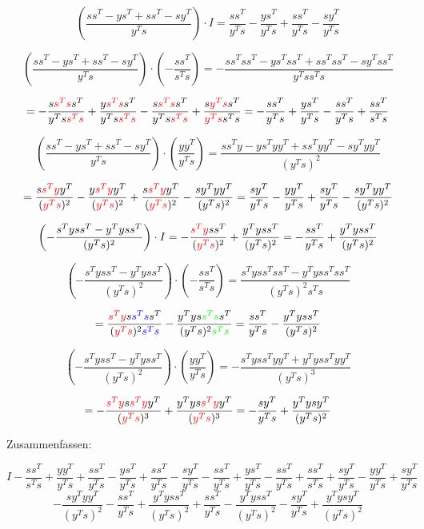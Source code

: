 \documentclass[a4paper, 12pt]{report}
\begin{document}
$$\left(\frac{ss^T - ys^T + ss^T - sy^T}{y^Ts}\right) \cdot I = \frac{ss^T}{y^Ts} - \frac{ys^T}{y^Ts} + \frac{ss^T}{y^Ts} - \frac{sy^T}{y^Ts}$$

$$\left(\frac{ss^T - ys^T + ss^T - sy^T}{y^Ts}\right)\cdot\left( - \frac{ss^T}{s^Ts} \right) = -\frac{ss^Tss^T - ys^Tss^T + ss^Tss^T - sy^Tss^T}{y^Tss^Ts}$$

$$= -\frac{s\textcolor{red}{s^Ts}s^T}{y^Ts\textcolor{red}{s^Ts}} + \frac{y\textcolor{red}{s^Ts}s^T}{y^Ts\textcolor{red}{s^Ts}} - \frac{s\textcolor{red}{s^Ts}s^T}{y^Ts\textcolor{red}{s^Ts}} + \frac{s\textcolor{red}{y^Ts}s^T}{\textcolor{red}{y^Ts}s^Ts} = -\frac{ss^T}{y^Ts} + \frac{ys^T}{y^Ts} - \frac{ss^T}{y^Ts} + \frac{ss^T}{s^Ts}$$

$$\left(\frac{ss^T - ys^T + ss^T - sy^T}{y^Ts}\right)\cdot \left( \frac{yy^T}{y^Ts} \right) = \frac{ss^Ty - ys^Tyy^T + ss^Tyy^T - sy^Tyy^T}{(y^Ts)^2}$$

$$= \frac{s\textcolor{red}{s^Ty}y^T}{(\textcolor{red}{y^Ts})^2} - \frac{y\textcolor{red}{s^Ty}y^T}{(\textcolor{red}{y^Ts})^2} + \frac{s\textcolor{red}{s^Ty}y^T}{(\textcolor{red}{y^Ts})^2}  - \frac{sy^Tyy^T}{(y^Ts)^2} = \frac{sy^T}{y^Ts} - \frac{yy^T}{y^Ts} + \frac{sy^T}{y^Ts} - \frac{sy^Tyy^T}{(y^Ts)^2} $$

$$ \left(-\frac{s^Tyss^T - y^Tyss^T}{(y^Ts)^2} \right)\cdot I = -\frac{\textcolor{red}{s^Ty}ss^T}{(\textcolor{red}{y^Ts})^2} + \frac{y^Tyss^T}{(y^Ts)^2} = -\frac{ss^T}{y^Ts} + \frac{y^Tyss^T}{(y^Ts)^2} $$

$$ \left(-\frac{s^Tyss^T - y^Tyss^T}{(y^Ts)^2} \right)\cdot \left( - \frac{ss^T}{s^Ts} \right) = \frac{s^Tyss^Tss^T - y^Tyss^Tss^T}{(y^Ts)^2s^Ts}$$

$$= \frac{\textcolor{red}{s^Ty}s\textcolor{blue}{s^Ts}s^T}{(\textcolor{red}{y^Ts})^2\textcolor{blue}{s^Ts}} - \frac{y^Tys\textcolor{green}{s^Ts}s^T}{(y^Ts)^2\textcolor{green}{s^Ts}} = \frac{ss^T}{y^Ts} - \frac{y^Tyss^T}{(y^Ts)^2}$$

$$ \left(-\frac{s^Tyss^T - y^Tyss^T}{(y^Ts)^2} \right)\cdot \left( \frac{yy^T}{y^Ts} \right) = -\frac{s^Tyss^Tyy^T + y^Tyss^Tyy^T}{(y^Ts)^3} $$

$$= -\frac{\textcolor{red}{s^Ty}s\textcolor{red}{s^Ty}y^T}{(\textcolor{red}{y^Ts})^3} + \frac{y^Tys\textcolor{red}{s^Ty}y^T}{(\textcolor{red}{y^Ts})^3} = -\frac{sy^T}{y^Ts} + \frac{y^Tysy^T}{(y^Ts)^2}$$

Zusammenfassen:

$$ I -\frac{ss^T}{s^Ts} + \frac{yy^T}{y^Ts} + \frac{ss^T}{y^Ts} - \frac{ys^T}{y^Ts} + \frac{ss^T}{y^Ts} - \frac{sy^T}{y^Ts} -\frac{ss^T}{y^Ts} + \frac{ys^T}{y^Ts} - \frac{ss^T}{y^Ts} + \frac{ss^T}{s^Ts} + \frac{sy^T}{y^Ts} - \frac{yy^T}{y^Ts} + \frac{sy^T}{y^Ts} $$
$$- \frac{sy^Tyy^T}{(y^Ts)^2} -\frac{ss^T}{y^Ts} + \frac{y^Tyss^T}{(y^Ts)^2} + \frac{ss^T}{y^Ts} - \frac{y^Tyss^T}{(y^Ts)^2} -\frac{sy^T}{y^Ts} + \frac{y^Tysy^T}{(y^Ts)^2} $$
\end{document}
